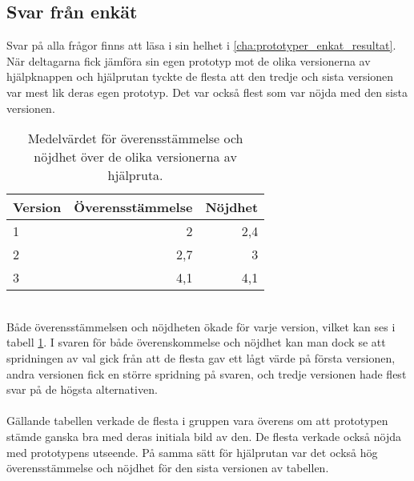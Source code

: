 \subsection{Svar från enkät}
Svar på alla frågor finns att läsa i sin helhet i \ref{cha:prototyper_enkat_resultat}. När deltagarna fick jämföra sin egen prototyp mot de olika versionerna av hjälpknappen och hjälprutan tyckte de flesta att den tredje och sista versionen var mest lik deras egen prototyp. Det var också flest som var nöjda med den sista versionen. 

\begin{table}[H]
	\caption{Medelvärdet för överensstämmelse och nöjdhet över de olika versionerna av hjälpruta.}
  \def\arraystretch{1.5}
  \begin{adjustbox}{max width=\textwidth}
    \begin{tabularx}{\textwidth}{ | X | r | r |}
      \hline
      \textbf{Version} & \textbf{Överensstämmelse} & \textbf{Nöjdhet} \\
      \hline
      1 & 2 & 2,4 \\
      \hline
      2 & 2,7 & 3 \\
      \hline 
      3 & 4,1 & 4,1 \\
      \hline 
    \end{tabularx}
  \end{adjustbox}
  \label{tab:medelvarde_hjalp}
\end{table}
\ \\
Både överensstämmelsen och nöjdheten ökade för varje version, vilket kan ses i tabell \ref{tab:medelvarde_hjalp}. I svaren för både överenskommelse och nöjdhet kan man dock se att spridningen av val gick från att de flesta gav ett lågt värde på första versionen, andra versionen fick en större spridning på svaren, och tredje versionen hade flest svar på de högsta alternativen.
\\ \\
Gällande tabellen verkade de flesta i gruppen vara överens om att prototypen stämde ganska bra med deras initiala bild av den. De flesta verkade också nöjda med prototypens utseende. På samma sätt för hjälprutan var det också hög överensstämmelse och nöjdhet för den sista versionen av tabellen.

